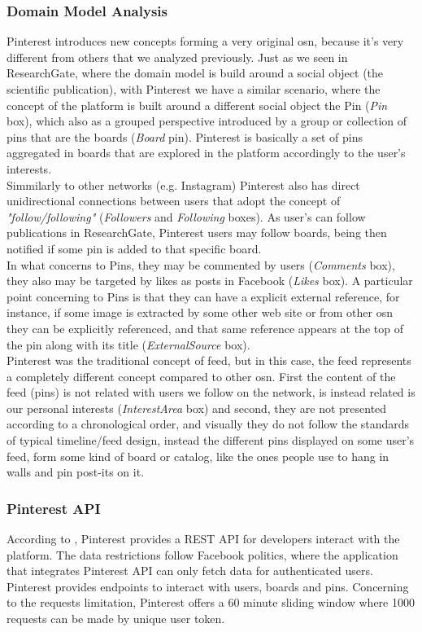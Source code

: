 \subsubsection*{Domain Model Analysis}
Pinterest introduces new concepts forming a very original \gls{osn}, because it's very different from others that we analyzed previously. Just as we seen in ResearchGate, where the domain model is build around a social object (the scientific publication), with Pinterest we have a similar scenario, where the concept of the platform is built around a different social object the Pin (\textit{Pin} box), which also as a grouped perspective introduced by a group or collection of pins that are the boards (\textit{Board} pin). Pinterest is basically a set of pins aggregated in boards that are explored in the platform accordingly to the user's interests.\\
\indent Simmilarly to other networks (e.g. Instagram) Pinterest also has direct unidirectional connections between users that adopt the concept of \textit{"follow/following"} (\textit{Followers} and \textit{Following} boxes). As user's can follow publications in ResearchGate, Pinterest users may follow boards, being then notified if some pin is added to that specific board.\\
\indent In what concerns to Pins, they may be commented by users (\textit{Comments} box), they also may be targeted by likes as posts in Facebook (\textit{Likes} box). A particular point concerning to Pins is that they can have a explicit external reference, for instance, if some image is extracted by some other web site or from other \gls{osn} they can be explicitly referenced, and that same reference appears at the top of the pin along with its title (\textit{ExternalSource} box).\\
\indent Pinterest was the traditional concept of feed, but in this case, the feed represents a completely different concept compared to other \gls{osn}. First the content of the feed (pins) is not related with users we follow on the network, is instead related is our personal interests (\textit{InterestArea} box) and second, they are not presented according to a chronological order, and visually they do not follow the standards of typical timeline/feed design, instead the different pins displayed on some user's feed, form some kind of board or catalog, like the ones people use to hang in walls and pin post-its on it.

\subsubsection*{Pinterest API}
According to \cite{pintdev}, Pinterest provides a REST API for developers interact with the platform. The data restrictions follow Facebook politics, where the application that integrates Pinterest API can only fetch data for authenticated users. Pinterest provides endpoints to interact with users, boards and pins. Concerning to the requests limitation, Pinterest offers a 60 minute sliding window where 1000 requests can be made by unique user token.

